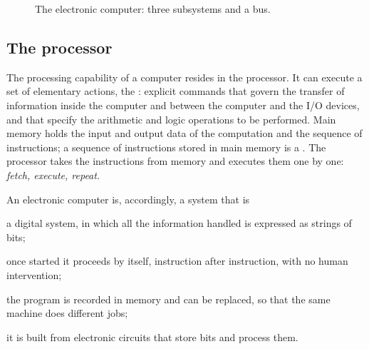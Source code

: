 \begin{figure}[htb]
\centering
{}
\caption{The electronic computer: three subsystems and a bus.}
\label{fig:b1:bus}
\end{figure}

\subsection{The processor}

The processing capability of a computer resides in the processor. It can
execute a set of elementary actions, the : explicit
commands that govern the transfer of information inside the computer and
between the computer and the I/O devices, and that specify the arithmetic and
logic operations to be performed. Main memory holds the input and output data
of the computation and the sequence of instructions; a sequence of
instructions stored in main memory is a . The processor takes
the instructions from memory and executes them one by one: \emph{fetch,
execute, repeat}.

An electronic computer is, accordingly, a system that is

\begin{description}[style=nextline,leftmargin=1.5em]
\item[numeric:] a digital system, in which all the information handled is
  expressed as strings of bits;
\item[automatic:] once started it proceeds by itself, instruction after
  instruction, with no human intervention;
\item[stored-program:] the program is recorded in memory and can be replaced,
  so that the same machine does different jobs;
\item[electronic:] it is built from electronic circuits that store bits and
  process them.
\end{description}

